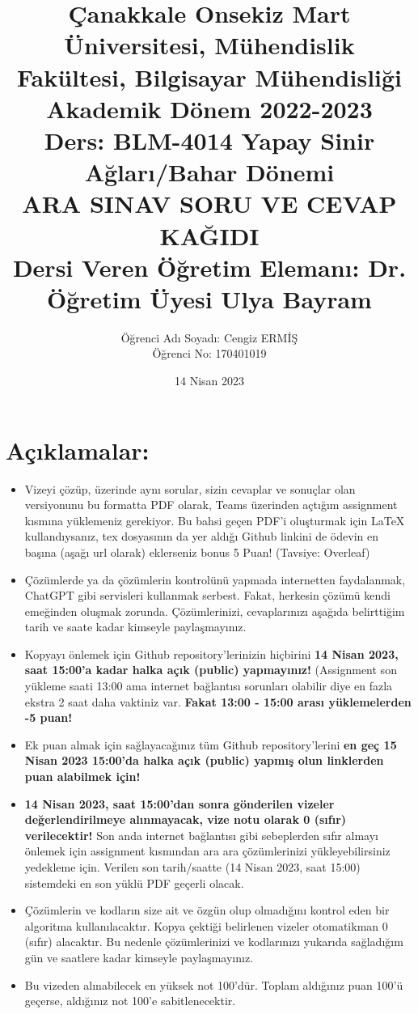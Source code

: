 \documentclass[11pt]{article}
\title{Çanakkale Onsekiz Mart Üniversitesi, Mühendislik Fakültesi, Bilgisayar Mühendisliği Akademik Dönem 2022-2023\\
Ders: BLM-4014 Yapay Sinir Ağları/Bahar Dönemi\\ 
ARA SINAV SORU VE CEVAP KAĞIDI\\
Dersi Veren Öğretim Elemanı: Dr. Öğretim Üyesi Ulya Bayram}
\author{%
\begin{minipage}{\textwidth}
\raggedright
Öğrenci Adı Soyadı: Cengiz ERMİŞ\\ %
Öğrenci No: 170401019
\end{minipage}%
}
\date{14 Nisan 2023}
\begin{document}
\maketitle

\vspace{-.5in}
\section*{Açıklamalar:}
\begin{itemize}
    \item Vizeyi çözüp, üzerinde aynı sorular, sizin cevaplar ve sonuçlar olan versiyonunu bu formatta PDF olarak, Teams üzerinden açtığım assignment kısmına yüklemeniz gerekiyor. Bu bahsi geçen PDF'i oluşturmak için LaTeX kullandıysanız, tex dosyasının da yer aldığı Github linkini de ödevin en başına (aşağı url olarak) eklerseniz bonus 5 Puan! (Tavsiye: Overleaf)
    \item Çözümlerde ya da çözümlerin kontrolünü yapmada internetten faydalanmak, ChatGPT gibi servisleri kullanmak serbest. Fakat, herkesin çözümü kendi emeğinden oluşmak zorunda. Çözümlerinizi, cevaplarınızı aşağıda belirttiğim tarih ve saate kadar kimseyle paylaşmayınız. 
    \item Kopyayı önlemek için Github repository'lerinizin hiçbirini \textbf{14 Nisan 2023, saat 15:00'a kadar halka açık (public) yapmayınız!} (Assignment son yükleme saati 13:00 ama internet bağlantısı sorunları olabilir diye en fazla ekstra 2 saat daha vaktiniz var. \textbf{Fakat 13:00 - 15:00 arası yüklemelerden -5 puan!}
    \item Ek puan almak için sağlayacağınız tüm Github repository'lerini \textbf{en geç 15 Nisan 2023 15:00'da halka açık (public) yapmış olun linklerden puan alabilmek için!}
    \item \textbf{14 Nisan 2023, saat 15:00'dan sonra gönderilen vizeler değerlendirilmeye alınmayacak, vize notu olarak 0 (sıfır) verilecektir!} Son anda internet bağlantısı gibi sebeplerden sıfır almayı önlemek için assignment kısmından ara ara çözümlerinizi yükleyebilirsiniz yedekleme için. Verilen son tarih/saatte (14 Nisan 2023, saat 15:00) sistemdeki en son yüklü PDF geçerli olacak.
    \item Çözümlerin ve kodların size ait ve özgün olup olmadığını kontrol eden bir algoritma kullanılacaktır. Kopya çektiği belirlenen vizeler otomatikman 0 (sıfır) alacaktır. Bu nedenle çözümlerinizi ve kodlarınızı yukarıda sağladığım gün ve saatlere kadar kimseyle paylaşmayınız.
    \item Bu vizeden alınabilecek en yüksek not 100'dür. Toplam aldığınız puan 100'ü geçerse, aldığınız not 100'e sabitlenecektir.

\end{itemize}
\end{document}
